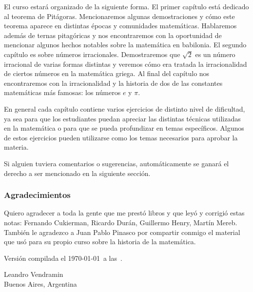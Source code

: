 El curso estará organizado de la siguiente forma.  El primer capítulo está
dedicado al teorema de Pitágoras. Mencionaremos algunas demostraciones y cómo
este teorema aparece en distintas épocas y comunidades matemáticas. Hablaremos
además de ternas pitagóricas y nos encontraremos con la oportunidad de
mencionar algunos hechos notables sobre la matemática en babilonia.  El segundo
capítulo es sobre números irracionales. Demostraremos que $\sqrt{2}$ es un
número irracional de varias formas distintas y veremos cómo era tratada la
irracionalidad de ciertos números en la matemática griega. Al final del
capítulo nos encontraremos con la irracionalidad y la historia de dos de las
constantes matemáticas más famosas: los números $e$ y $\pi$. 

En general cada capítulo contiene varios ejercicios de distinto nivel de
dificultad, ya sea para que los estudiantes puedan apreciar las distintas
técnicas utilizadas en la matemática o para que se pueda profundizar en temas
específicos. Algunos de estos ejercicios pueden utilizarse como los temas
necesarios para aprobar la materia. 

Si alguien tuviera comentarios o sugerencias, automáticamente se ganará el
derecho a ser mencionado en la siguiente sección.

\subsubsection*{Agradecimientos}

Quiero agradecer a toda la gente que me prestó libros y que leyó y corrigió
estas notas: Fernando Cukierman, Ricardo Durán, Guillermo Henry, Martín Mereb. También le agradezco a Juan Pablo
Pinasco por compartir conmigo el material que usó para su propio curso sobre la
historia de la matemática. 

\medskip
Versión compilada el \today~a las~\currenttime.

\bigskip
\begin{flushright}
Leandro Vendramin\\Buenos Aires, Argentina\par
\end{flushright}

